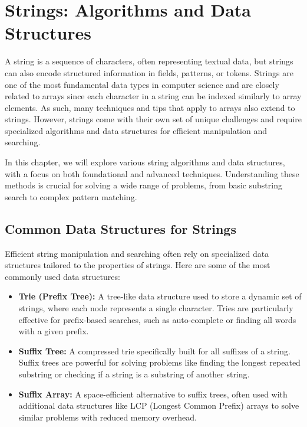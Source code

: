 \chapter{Strings: Algorithms and Data Structures}
\label{chap:Strings}

A string is a sequence of characters, often representing textual data, but strings can also encode structured information in fields, patterns, or tokens. Strings are one of the most fundamental data types in computer science and are closely related to arrays since each character in a string can be indexed similarly to array elements. As such, many techniques and tips that apply to arrays also extend to strings. However, strings come with their own set of unique challenges and require specialized algorithms and data structures for efficient manipulation and searching.

In this chapter, we will explore various string algorithms and data structures, with a focus on both foundational and advanced techniques. Understanding these methods is crucial for solving a wide range of problems, from basic substring search to complex pattern matching.

\section*{Common Data Structures for Strings}
Efficient string manipulation and searching often rely on specialized data structures tailored to the properties of strings. Here are some of the most commonly used data structures:

\begin{itemize}
    \item \textbf{Trie (Prefix Tree):}  
    A tree-like data structure used to store a dynamic set of strings, where each node represents a single character. Tries are particularly effective for prefix-based searches, such as auto-complete or finding all words with a given prefix.
    
    \item \textbf{Suffix Tree:}  
    A compressed trie specifically built for all suffixes of a string. Suffix trees are powerful for solving problems like finding the longest repeated substring or checking if a string is a substring of another string.
    
    \item \textbf{Suffix Array:}  
    A space-efficient alternative to suffix trees, often used with additional data structures like LCP (Longest Common Prefix) arrays to solve similar problems with reduced memory overhead.
\end{itemize}

